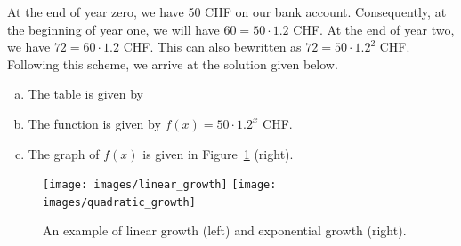 \begin{solution*}
	At the end of year zero, we have 50 CHF on our bank account.
	Consequently, at the beginning of year one, we will have $60=50\cdot 1.2$ CHF.
	At the end of year two, we have $72=60\cdot 1.2$ CHF.
	This can also bewritten as $72=50\cdot 1.2^2$ CHF.
	Following this scheme, we arrive at the solution given below.
	\begin{enumerate}[a)]
		\item The table is given by
		\begin{center}
		\end{center}
		\item The function is given by $f\left(x\right)=50\cdot 1.2^x$ CHF.
		\item The graph of $f\left(x\right)$ is given in Figure~\ref{fig:linear_exponential_growth} (right).
	\end{enumerate}
\end{solution*}
\begin{figure}[ht]
	\centering
	\texttt{[image: images/linear\_growth]}\hfill
	\texttt{[image: images/quadratic\_growth]}
	\caption{An example of linear growth (left) and exponential growth (right).}
	\label{fig:linear_exponential_growth}
\end{figure}
